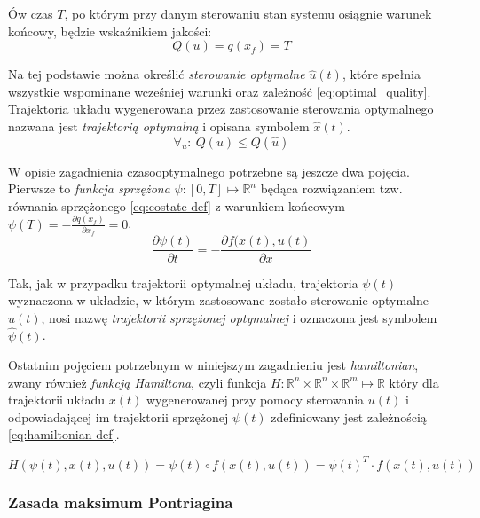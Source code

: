 Ów czas $T$, po którym przy danym sterowaniu stan systemu osiągnie warunek końcowy, będzie wskaźnikiem jakości: 
\begin{equation}\label{eq:quality}
    Q(u) = q(x_{f}) = T
\end{equation}

Na tej podstawie można określić \emph{sterowanie optymalne} $\hat{u}(t)$, które spełnia wszystkie wspominane wcześniej warunki oraz zależność \ref{eq:optimal_quality}. Trajektoria układu wygenerowana przez zastosowanie sterowania optymalnego nazwana jest \emph{trajektorią optymalną} i opisana symbolem $\hat{x}(t)$.
\begin{equation}\label{eq:optimal_quality}
    \forall_{u}:~ Q(u) \leq Q(\hat{u})
\end{equation}

W opisie zagadnienia czasooptymalnego potrzebne są jeszcze dwa pojęcia.
Pierwsze to \emph{funkcja sprzężona} $\psi: [0, T] \longmapsto \mathbb{R}^{n}$ będąca rozwiązaniem tzw. równania sprzężonego \ref{eq:costate-def} z warunkiem końcowym
$\psi(T) = - \frac{\partial q(x_{f})}{\partial x_{f}} = 0$.
\begin{equation}\label{eq:costate-def}
\frac{\partial \psi(t)}{\partial t} = - \frac{\partial f(x(t), u(t)}{\partial x}
\end{equation}

Tak, jak w przypadku trajektorii optymalnej układu, trajektoria $\psi(t)$ wyznaczona w układzie, w którym zastosowane zostało sterowanie optymalne $\hat{u}(t)$, nosi nazwę \emph{trajektorii sprzężonej optymalnej} i oznaczona jest symbolem $\hat{\psi}(t)$.

Ostatnim pojęciem potrzebnym w niniejszym zagadnieniu jest \emph{hamiltonian}, zwany również \emph{funkcją Hamiltona}, czyli funkcja $H: \mathbb{R}^{n} \times \mathbb{R}^{n} \times \mathbb{R}^{m} \longmapsto \mathbb{R}$ który dla trajektorii układu $x(t)$ wygenerowanej przy pomocy sterowania $u(t)$ i odpowiadającej im trajektorii sprzężonej $\psi(t)$ zdefiniowany jest zależnością \ref{eq:hamiltonian-def}.

\begin{equation}\label{eq:hamiltonian-def}
H(\psi(t), x(t), u(t)) = \psi(t) \circ f(x(t), u(t)) = \psi(t)^{T} \cdot f(x(t), u(t))
\end{equation}

\subsubsection{Zasada maksimum Pontriagina}
\label{sub:toc-def-pontriagin}

